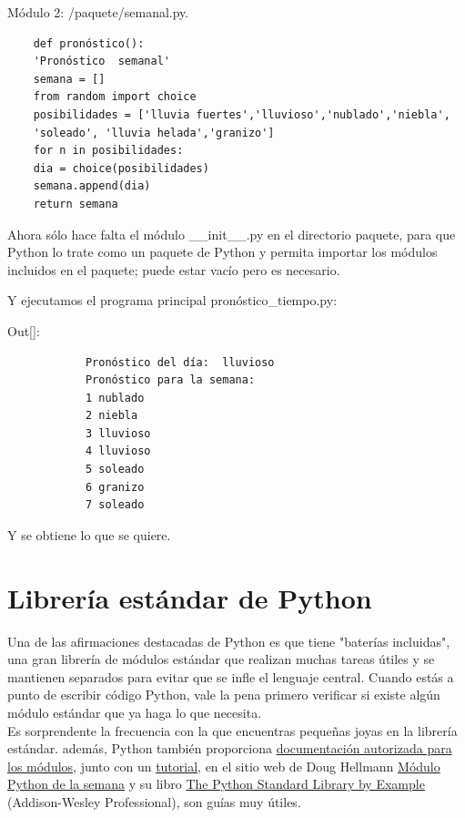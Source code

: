 Módulo 2: {\ttfamily \scriptsize/paquete/semanal.py}.

\hspace{-2.30cm}{\ttfamily \scriptsize semanal.py}  \vspace{-0.5cm}
\begin{lstlisting}
	def pronóstico():
	'Pronóstico  semanal'
	semana = []
	from random import choice
	posibilidades = ['lluvia fuertes','lluvioso','nublado','niebla',
	'soleado', 'lluvia helada','granizo']
	for n in posibilidades:
	dia = choice(posibilidades)
	semana.append(dia)
	return semana
\end{lstlisting}

Ahora sólo hace falta  el módulo {\ttfamily \_\!\_init\_\!\_.py} en el directorio paquete, para que Python lo trate como un paquete
de Python y permita importar los módulos incluidos en el paquete;  puede estar vacío pero es necesario.

Y ejecutamos el programa principal {\ttfamily pronóstico\_tiempo.py}:\vspace{0.07cm}

{\ttfamily\scriptsize\noindent Out[]: \vspace{-0.3cm}	
	{\color{blue} 	
		\begin{verbatim}
			Pronóstico del día:  lluvioso
			Pronóstico para la semana: 
			1 nublado
			2 niebla
			3 lluvioso
			4 lluvioso
			5 soleado
			6 granizo
			7 soleado
		\end{verbatim}
}}


Y se obtiene lo que se quiere.


\section{Librería estándar de Python}


Una de las afirmaciones destacadas de Python es que tiene "baterías incluidas", una gran 
librería de módulos estándar que realizan muchas tareas útiles y se mantienen separados para 
evitar que se infle el lenguaje central. Cuando estás a punto de escribir código Python, vale la pena primero
verificar si existe algún  módulo estándar que ya haga lo que necesita.\\

Es sorprendente la frecuencia con la que encuentras pequeñas joyas en la librería estándar. además, Python también
proporciona \href{https://docs.python.org/es/3/library/}{\color{vino} documentación autorizada para los módulos}, junto con un \href{https://docs.python.org/3.3/tutorial/stdlib.html}{\color{vino} tutorial}, en el sitio web de  Doug  Hellmann \href{http://pymotw.com/2/contents.html}{\color{vino} Módulo Python de la semana} y su libro \href{https://doughellmann.com/books/the-python-standard-library-by-example/}{\color{vino}The Python Standard Library by Example} (Addison-Wesley Professional), son guías muy útiles.\\ 


